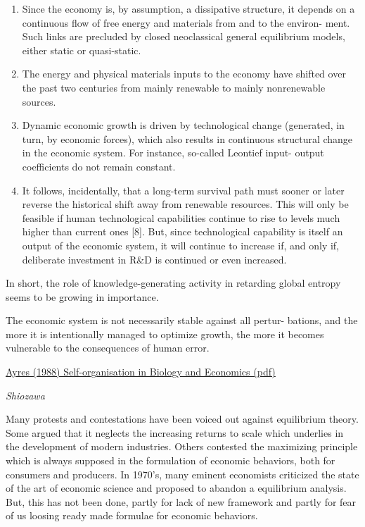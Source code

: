 \documentclass[
]{book}
\begin{document}
\begin{enumerate}
\def\labelenumi{(\arabic{enumi})}
\item
  Since the economy is, by assumption, a dissipative structure, it depends on
  a continuous flow of free energy and materials from and to the environ-
  ment. Such links are precluded by closed neoclassical general equilibrium
  models, either static or quasi-static.
\item
  The energy and physical materials inputs to the economy have shifted over
  the past two centuries from mainly renewable to mainly nonrenewable
  sources.
\item
  Dynamic economic growth is driven by technological change (generated, in
  turn, by economic forces), which also results in continuous structural
  change in the economic system. For instance, so-called Leontief input-
  output coefficients do not remain constant.
\item
  It follows, incidentally, that a long-term survival path must sooner or later
  reverse the historical shift away from renewable resources. This will only
  be feasible if human technological capabilities continue to rise to levels
  much higher than current ones {[}8{]}. But, since technological capability is
  itself an output of the economic system, it will continue to increase if, and
  only if, deliberate investment in R\&D is continued or even increased.
\end{enumerate}

In short, the role of knowledge-generating activity in retarding global entropy
seems to be growing in importance.

The economic system is not necessarily stable against all pertur-
bations, and the more it is intentionally managed to optimize growth, the more it
becomes vulnerable to the consequences of human error.

\href{pdf/Ayres_1988_Self-organist\%20aion_in_Biology_and_Economics.pdf}{Ayres (1988) Self-organisation in Biology and Economics (pdf)}

\emph{Shiozawa}

Many protests and contestations have been voiced out against equilibrium
theory. Some argued that it neglects the increasing returns to scale which
underlies in the development of modern industries. Others contested the
maximizing principle which is always supposed in the formulation of
economic behaviors, both for consumers and producers. In 1970's, many
eminent economists criticized the state of the art of economic science and
proposed to abandon a equilibrium analysis. But, this has not been done,
partly for lack of new framework and partly for fear of us loosing ready made
formulae for economic behaviors.
\end{document}
